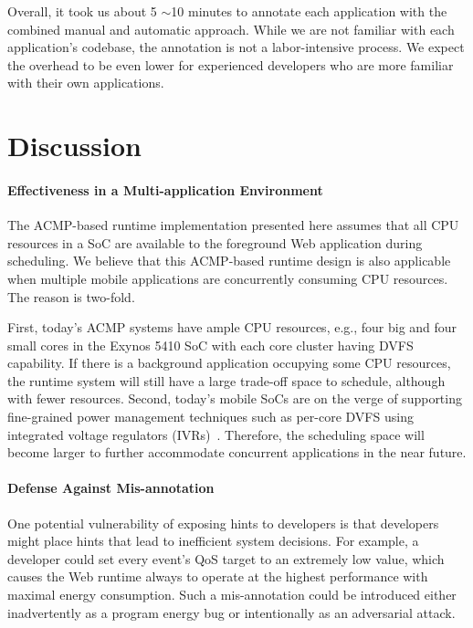 Overall, it took us about 5 $\sim$10 minutes to annotate each application with the combined manual and automatic approach. While we are not familiar with each application's codebase, the annotation is not a labor-intensive process. We expect the overhead to be even lower for experienced developers who are more familiar with their own applications.

\section{Discussion}
\label{sec:lang:disc}

\paragraph{Effectiveness in a Multi-application Environment} The ACMP-based \greenweb runtime implementation presented here assumes that all CPU resources in a SoC are available to the foreground Web application during scheduling. We believe that this ACMP-based runtime design is also applicable when multiple mobile applications are concurrently consuming CPU resources. The reason is two-fold.

First, today's ACMP systems have ample CPU resources, e.g., four big and four small cores in the Exynos 5410 SoC with each core cluster having DVFS capability. If there is a background application occupying some CPU resources, the \greenweb runtime system will still have a large trade-off space to schedule, although with fewer resources. Second, today's mobile SoCs are on the verge of supporting fine-grained power management techniques such as per-core DVFS using integrated voltage regulators (IVRs)~\cite{ivr}. Therefore, the scheduling space will become larger to further accommodate concurrent applications in the near future.

\paragraph{Defense Against Mis-annotation} One potential vulnerability of exposing \greenweb hints to developers is that developers might place hints that lead to inefficient system decisions. For example, a developer could set every event's QoS target to an extremely low value, which causes the Web runtime always to operate at the highest performance with maximal energy consumption. Such a mis-annotation could be introduced either inadvertently as a program energy bug or intentionally as an adversarial attack.

